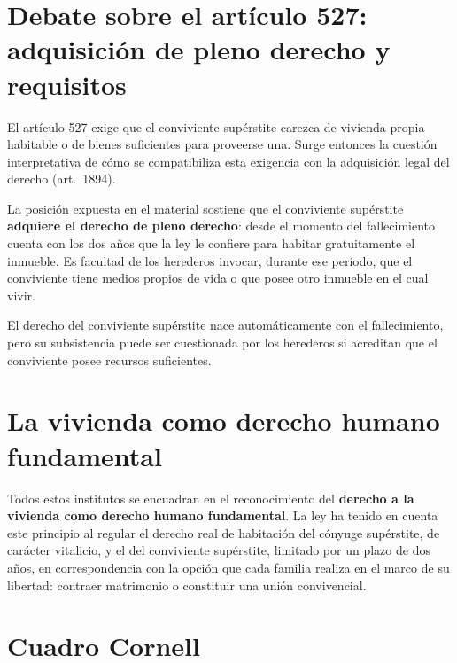 \documentclass[12pt,oneside]{book}
\begin{document}
\section{Debate sobre el artículo 527: adquisición de pleno derecho y requisitos}

El artículo 527 exige que el conviviente supérstite carezca de vivienda propia habitable o de bienes suficientes para proveerse una. Surge entonces la cuestión interpretativa de cómo se compatibiliza esta exigencia con la adquisición legal del derecho (art.~1894).

La posición expuesta en el material sostiene que el conviviente supérstite \textbf{adquiere el derecho de pleno derecho}: desde el momento del fallecimiento cuenta con los dos años que la ley le confiere para habitar gratuitamente el inmueble. Es facultad de los herederos invocar, durante ese período, que el conviviente tiene medios propios de vida o que posee otro inmueble en el cual vivir.

\begin{important}
El derecho del conviviente supérstite nace automáticamente con el fallecimiento, pero su subsistencia puede ser cuestionada por los herederos si acreditan que el conviviente posee recursos suficientes.
\end{important}

\section{La vivienda como derecho humano fundamental}

Todos estos institutos se encuadran en el reconocimiento del \textbf{derecho a la vivienda como derecho humano fundamental}. La ley ha tenido en cuenta este principio al regular el derecho real de habitación del cónyuge supérstite, de carácter vitalicio, y el del conviviente supérstite, limitado por un plazo de dos años, en correspondencia con la opción que cada familia realiza en el marco de su libertad: contraer matrimonio o constituir una unión convivencial.

\section{Cuadro Cornell}
\end{document}
